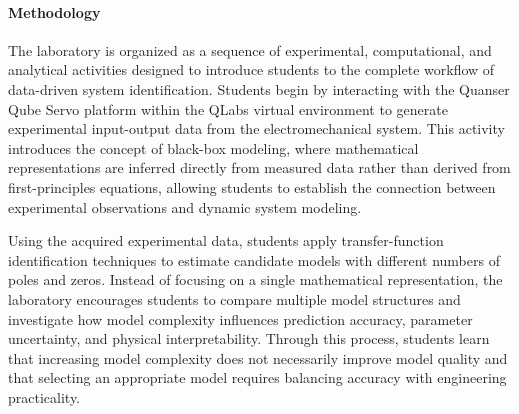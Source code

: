\documentclass[journal]{IEEEtran}
\begin{document}


\paragraph{Methodology}

The laboratory is organized as a sequence of experimental, computational, and analytical activities designed to introduce students to the complete workflow of data-driven system identification. Students begin by interacting with the Quanser Qube Servo platform within the QLabs virtual environment to generate experimental input-output data from the electromechanical system. This activity introduces the concept of black-box modeling, where mathematical representations are inferred directly from measured data rather than derived from first-principles equations, allowing students to establish the connection between experimental observations and dynamic system modeling.

Using the acquired experimental data, students apply transfer-function identification techniques to estimate candidate models with different numbers of poles and zeros. Instead of focusing on a single mathematical representation, the laboratory encourages students to compare multiple model structures and investigate how model complexity influences prediction accuracy, parameter uncertainty, and physical interpretability. Through this process, students learn that increasing model complexity does not necessarily improve model quality and that selecting an appropriate model requires balancing accuracy with engineering practicality.
\end{document}
